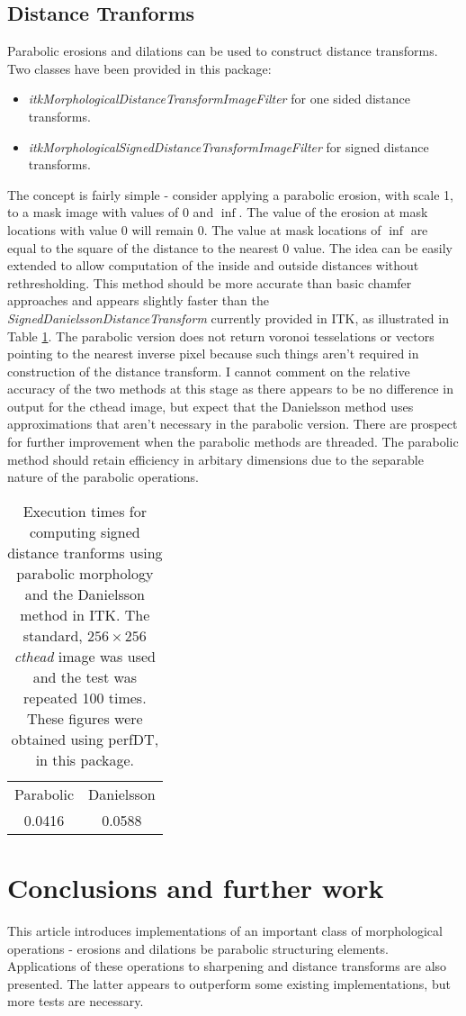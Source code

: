 \documentclass{InsightArticle}
\begin{document}
\subsection{Distance Tranforms}
Parabolic erosions and dilations can be used to construct distance
transforms. Two classes have been provided in this package:
\begin{itemize}
\item {\em itkMorphologicalDistanceTransformImageFilter} for one sided distance transforms.
\item {\em itkMorphologicalSignedDistanceTransformImageFilter} for signed distance transforms.
\end{itemize}
The concept is fairly simple - consider applying a parabolic erosion,
with scale 1, to a mask image with values of $0$ and $\inf$. The value
of the erosion at mask locations with value 0 will remain 0. The value
at mask locations of $\inf$ are equal to the square of the distance to
the nearest 0 value. The idea can be easily extended to allow
computation of the inside and outside distances without
rethresholding. This method should be more accurate than basic chamfer
approaches and appears slightly faster than the {\em
  SignedDanielssonDistanceTransform} currently provided in ITK, as
illustrated in Table \ref{tbl:perf}. The parabolic version does not
return voronoi tesselations or vectors pointing to the nearest inverse
pixel because such things aren't required in construction of the
distance transform. I cannot comment on the relative accuracy of the
two methods at this stage as there appears to be no difference in
output for the cthead image, but expect that the Danielsson method
uses approximations that aren't necessary in the parabolic
version. There are prospect for further improvement when the parabolic
methods are threaded. The parabolic method should retain efficiency in
arbitary dimensions due to the separable nature of the parabolic
operations.
\begin{table}[phtb]
\centering
\begin{tabular}{cc}
\hline
Parabolic &  Danielsson \\
0.0416  & 0.0588 \\
\hline
\end{tabular}
\caption{Execution times for computing signed distance tranforms using parabolic morphology and the Danielsson method in ITK. The standard, $256 \times 256$ {\em cthead} image was used and the test was repeated 100 times. These figures were obtained using perfDT, in this package.\label{tbl:perf}}
\end{table}
\appendix


\section{Conclusions and further work}
This article introduces implementations of an important class of
morphological operations - erosions and dilations be parabolic
structuring elements. Applications of these operations to sharpening
and distance transforms are also presented. The latter appears to
outperform some existing implementations, but more tests are
necessary.



\nocite{ITKSoftwareGuide}
\end{document}
